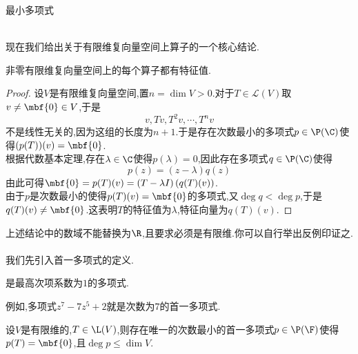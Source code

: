 \documentclass{ctexart}
\begin{document}
\pagestyle{empty}
\begin{center}\large 最小多项式\end{center}
\\
现在我们给出关于有限维复向量空间上算子的一个核心结论.
\begin{formal}[1.1 特征值的存在性]
    非零有限维复向量空间上的每个算子都有特征值.
\end{formal}
\begin{proof}
    设$V$是有限维复向量空间,置$n=\dim V>0$.对于$T\in\mathcal{L}(V)$取$v\neq\mbf{0}\in V$,于是
    $$v,Tv,T^2v,\cdots,T^nv$$
    不是线性无关的,因为这组的长度为$n+1$.于是存在次数最小的多项式$p\in\P(\C)$使得$(p(T))(v)=\mbf{0}$.\\
    根据代数基本定理,存在$\lambda\in\C$使得$p(\lambda)=0$,因此存在多项式$q\in\P(\C)$使得$$p(z)=(z-\lambda)q(z)$$
    由此可得$\mbf{0}=p(T)(v)=(T-\lambda I)\left(q(T)(v)\right)$.\\
    由于$p$是次数最小的使得$p(T)(v)=\mbf{0}$的多项式,又$\deg q<\deg p$,于是$q(T)(v)\neq\mbf{0}$.这表明$T$的特征值为$\lambda$,特征向量为$q(T)(v)$.
\end{proof}\noindent
上述结论中的数域不能替换为$\R$,且要求必须是有限维.你可以自行举出反例印证之.\\
\\
我们先引入首一多项式的定义.
\begin{definition}[2.1 定义:首一多项式]
    是最高次项系数为$1$的多项式.
\end{definition}\noindent
例如,多项式$z^7-7z^5+2$就是次数为$7$的首一多项式.
\begin{formal}[2.2 最小多项式的存在唯一性和次数]
    设$V$是有限维的,$T\in\L(V)$,则存在唯一的次数最小的首一多项式$p\in\P(\F)$使得$p(T)=\mbf{0}$,且$\deg p\leqslant \dim V$.
\end{formal}
\end{document}
